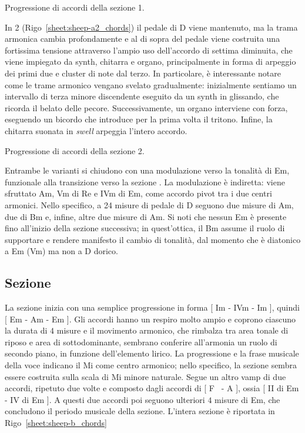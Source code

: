 \documentclass[class=book, crop=false, oneside, 12pt]{standalone}
\begin{document}
    \begin{sheet}[htb]
        \centering
        \caption{Progressione di accordi della sezione 1.}
        \label{sheet:sheep-a1_chords}
    \end{sheet}

    In 2 (Rigo~\ref{sheet:sheep-a2_chords}) il pedale di D viene mantenuto, ma la trama armonica cambia profondamente e al di sopra del pedale viene costruita una fortissima tensione attraverso l'ampio uso dell'accordo di settima diminuita, che viene impiegato da synth, chitarra e organo, principalmente in forma di arpeggio dei primi due e cluster di note dal terzo. In particolare, è interessante notare come le trame armonico vengano svelato gradualmente: inizialmente sentiamo un intervallo di terza minore discendente eseguito da un synth in glissando, che ricorda il belato delle pecore.
    Successivamente, un organo interviene con forza, eseguendo un bicordo che introduce per la prima volta il tritono. Infine, la chitarra suonata in \emph{swell} arpeggia l'intero accordo. 
    
    \begin{sheet}[htb]
        \centering
        \caption{Progressione di accordi della sezione 2.}
        \label{sheet:sheep-a2_chords}
    \end{sheet}

    Entrambe le varianti si chiudono con una modulazione verso la tonalità di Em, funzionale alla transizione verso la sezione . La modulazione è indiretta: viene sfruttato Am, Vm di Re e IVm di Em,  come accordo pivot tra i due centri armonici. Nello specifico, a 24 misure di pedale di D seguono due misure di Am, due di Bm e, infine, altre due misure di Am. Si noti che nessun Em è presente fino all'inizio della sezione successiva; in quest'ottica,  il Bm assume il ruolo di supportare e rendere manifesto il cambio di tonalità, dal momento che è diatonico a Em (Vm) ma non a D dorico. 

    \subsection{Sezione }
    La sezione  inizia con una semplice progressione in forma [ Im - IVm - Im ], quindi [ Em - Am - Em ]. Gli accordi hanno un respiro molto ampio e coprono ciascuno la durata di \(4\) misure e il movimento armonico, che rimbalza tra area tonale di riposo e area di sottodominante, sembrano conferire all'armonia un ruolo di secondo piano, in funzione dell'elemento lirico. La progressione e la frase musicale della voce indicano il Mi come centro armonico; nello specifico, la sezione sembra essere costruita sulla scala di Mi minore naturale.
    Segue un altro vamp di due accordi, ripetuto due volte e composto dagli accordi di [ F\sharp~ - A ], ossia [ II di Em - IV di Em ].  A questi due accordi poi seguono ulteriori \(4\) misure di Em, che concludono il periodo musicale della sezione. L'intera sezione è riportata in Rigo~\ref{sheet:sheep-b_chords}
\end{document}
